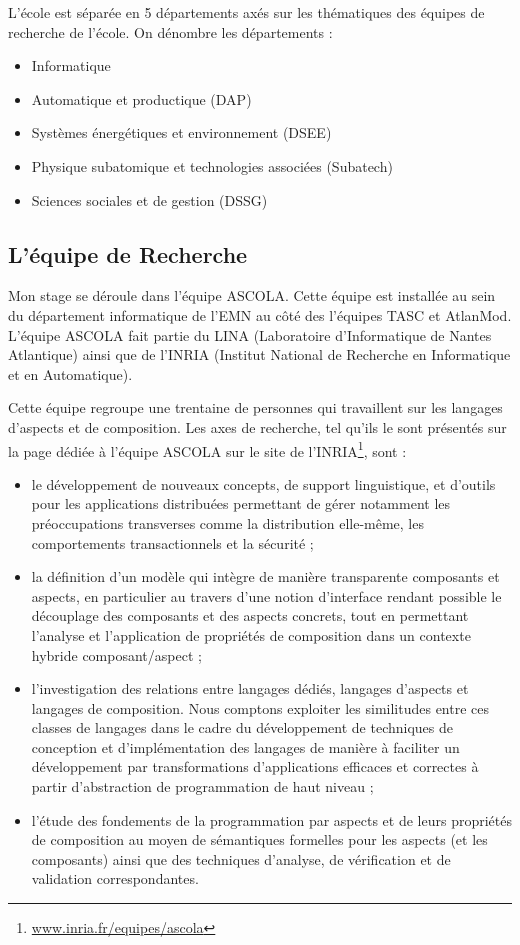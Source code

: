 \documentclass[a4paper, 11pt]{report}
\begin{document}
L’école est séparée en 5 départements axés sur les thématiques des équipes de recherche de l'école. On dénombre les départements :
\begin{itemize}
	\item Informatique
	\item Automatique et productique (DAP)
	\item Systèmes énergétiques et environnement (DSEE)
	\item Physique subatomique et technologies associées (Subatech)
	\item Sciences sociales et de gestion (DSSG)
\end{itemize}

		\subsection{L'équipe de Recherche}
Mon stage se déroule dans l'équipe ASCOLA. Cette équipe est installée au sein du département informatique de l’EMN au côté des l'équipes TASC et AtlanMod. L'équipe ASCOLA fait partie du LINA (Laboratoire d'Informatique de Nantes Atlantique) ainsi que de l'INRIA (Institut National de Recherche en Informatique et en Automatique).

Cette équipe regroupe une trentaine de personnes qui travaillent sur les langages d'aspects et de composition. Les axes de recherche, tel qu'ils le sont présentés sur la page dédiée à l'équipe ASCOLA sur le site de l'INRIA\footnote{\href{http://www.inria.fr/equipes/ascola}{www.inria.fr/equipes/ascola}}, sont :
\begin{itemize}
	\item le développement de nouveaux concepts, de support linguistique, et d'outils pour les applications distribuées permettant de gérer notamment les préoccupations transverses comme la distribution elle-même, les comportements transactionnels et la sécurité ;
	\item la définition d'un modèle qui intègre de manière transparente composants et aspects, en particulier au travers d'une notion d'interface rendant possible le découplage des composants et des aspects concrets, tout en permettant l'analyse et l'application de propriétés de composition dans un contexte hybride composant/aspect ;
	\item l'investigation des relations entre langages dédiés, langages d'aspects et langages de composition. Nous comptons exploiter les similitudes entre ces classes de langages dans le cadre du développement de techniques de conception et d'implémentation des langages de manière à faciliter un développement par transformations d'applications efficaces et correctes à partir d'abstraction de programmation de haut niveau ;
	\item l'étude des fondements de la programmation par aspects et de leurs propriétés de composition au moyen de sémantiques formelles pour les aspects (et les composants) ainsi que des techniques d'analyse, de vérification et de validation correspondantes.
\end{itemize}
\end{document}
